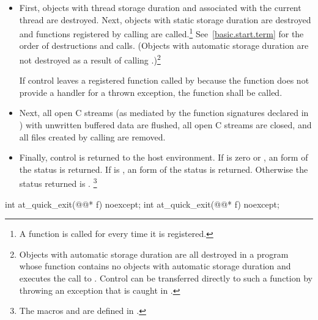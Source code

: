\begin{itemdescr}
\pnum
\effects
\begin{itemize}
\item
First, objects with thread storage duration and associated with the current thread
are destroyed. Next, objects with static storage duration are destroyed
and functions registered by calling
are called.\footnote{A function is called for every time it is registered.}
See~\ref{basic.start.term} for the order of destructions and calls.
(Objects with automatic storage duration are not destroyed as a result of calling
.)\footnote{Objects with automatic storage duration are all destroyed in a program whose
 function
contains no objects with automatic storage duration and executes the call to
.
Control can be transferred directly to such a
 function
by throwing an exception that is caught in
.}

If control leaves a registered function called by  because the function does
not provide a handler for a thrown exception, the function  shall be called.%
%

\item
Next, all open C streams (as mediated by the function
signatures declared in )
with unwritten buffered data are flushed, all open C
streams are closed, and all files created by calling
 are removed.

\item
Finally, control is returned to the host environment.
If  is zero or
,
an 
form of the status
is returned.
If  is
,
an  form of the status
is returned.
Otherwise the status returned is .%
\footnote{The macros  and 
are defined in .}
\end{itemize}
\end{itemdescr}

%
\begin{itemdecl}
int at_quick_exit(@@* f) noexcept;
int at_quick_exit(@@* f) noexcept;
\end{itemdecl}

